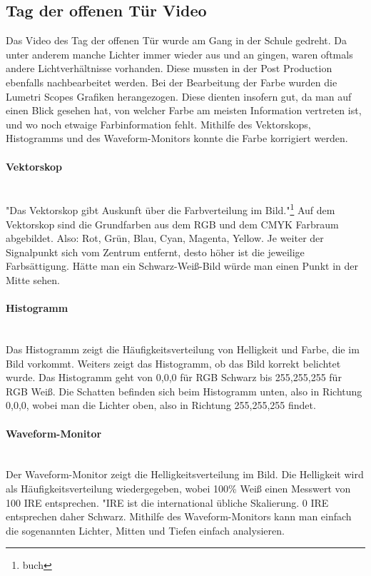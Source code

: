 \subsection{Tag der offenen Tür Video}
Das Video des Tag der offenen Tür wurde am Gang in der Schule gedreht. Da unter anderem manche Lichter immer wieder aus und an gingen, waren oftmals andere Lichtverhältnisse vorhanden. Diese mussten in der Post Production ebenfalls nachbearbeitet werden. Bei der Bearbeitung der Farbe wurden die Lumetri Scopes Grafiken herangezogen. Diese dienten insofern gut, da man auf einen Blick gesehen hat, von welcher Farbe am meisten Information vertreten ist, und wo noch etwaige Farbinformation fehlt. Mithilfe des Vektorskops, Histogramms und des Waveform-Monitors konnte die Farbe korrigiert werden.
\paragraph{Vektorskop}
\leavevmode \\
"Das Vektorskop gibt Auskunft über die Farbverteilung im Bild."\footnote{\label{}buch} Auf dem Vektorskop sind die Grundfarben aus dem RGB und dem CMYK Farbraum abgebildet. Also: Rot, Grün, Blau, Cyan, Magenta, Yellow. Je weiter der Signalpunkt sich vom Zentrum entfernt, desto höher ist die jeweilige Farbsättigung. Hätte man ein Schwarz-Weiß-Bild würde man einen Punkt in der Mitte sehen.
\paragraph{Histogramm}
\leavevmode \\
Das Histogramm zeigt die Häufigkeitsverteilung von Helligkeit und Farbe, die im Bild vorkommt. Weiters zeigt das Histogramm, ob das Bild korrekt belichtet wurde. Das Histogramm geht von 0,0,0 für RGB Schwarz bis 255,255,255 für RGB Weiß. Die Schatten befinden sich beim Histogramm unten, also in Richtung 0,0,0, wobei man die Lichter oben, also in Richtung 255,255,255 findet.
\paragraph{Waveform-Monitor}
\leavevmode \\
Der Waveform-Monitor zeigt die Helligkeitsverteilung im Bild. Die Helligkeit wird als Häufigkeitsverteilung wiedergegeben, wobei 100\% Weiß einen Messwert von 100 IRE entsprechen. "IRE ist die international übliche Skalierung. 0 IRE entsprechen daher Schwarz. Mithilfe des Waveform-Monitors kann man einfach die sogenannten Lichter, Mitten und Tiefen einfach analysieren. 
